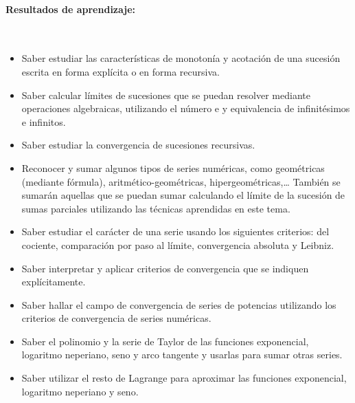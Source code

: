 \paragraph{Resultados de aprendizaje:}\ \par\vspace{-1em}
\begin{itemize}

\item
Saber estudiar las características de monotonía y acotación de una sucesión escrita en forma explícita o en forma recursiva.
\item
Saber calcular límites de sucesiones que se puedan resolver mediante operaciones algebraicas, utilizando el número e y equivalencia de infinitésimos e infinitos.
\item
Saber estudiar la convergencia de sucesiones recursivas.
\item
Reconocer y sumar algunos tipos de series numéricas, como geométricas (mediante fórmula), aritmético-geométricas, hipergeométricas,\dots
También se sumarán aquellas que se puedan sumar calculando el límite de la sucesión de sumas parciales utilizando las técnicas aprendidas en este tema.

\item
Saber estudiar el carácter de una serie usando los siguientes criterios:
del cociente, comparación por paso al límite, convergencia absoluta y Leibniz.

\item
Saber interpretar y aplicar criterios de convergencia que se indiquen explícitamente.

\item
Saber hallar el campo de convergencia de series de potencias utilizando los criterios de convergencia de series numéricas.

\item
Saber el polinomio y la serie de Taylor de las funciones exponencial, logaritmo neperiano, seno y arco tangente y usarlas para sumar otras series.

\item
Saber utilizar el resto de Lagrange para aproximar las funciones  exponencial, logaritmo neperiano y seno.


\end{itemize}
